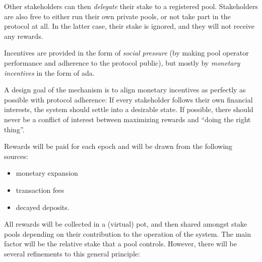 \documentclass[11pt,a4paper]{article}
\begin{document}
Other stakeholders can then \emph{delegate} their stake to a registered
pool.  Stakeholders are also free to either run their own private
pools, or not take part in the protocol at all. In the latter case,
their stake is ignored, and they will not receive any rewards.

Incentives are provided in the form of \emph{social pressure} (by making
pool operator performance and adherence to the protocol public), but
mostly by \emph{monetary incentives} in the form of ada.

A design goal of the mechanism is to align monetary incentives as
perfectly as possible with protocol adherence: If every stakeholder
follows their own financial interests, the system should settle into a
desirable state. If possible, there should never be a conflict of
interest between maximizing rewards and ``doing the right thing''.

Rewards will be paid for each epoch and will be drawn from the following
sources:

\begin{itemize}
\item
  monetary expansion
\item
  transaction fees
\item
  decayed deposits.
\end{itemize}

All rewards will be collected in a (virtual) pot, and then shared amongst stake
pools depending on their contribution to the operation of the system. The main
factor will be the relative stake that a pool controls. However, there will be
several refinements to this general principle:
\end{document}
